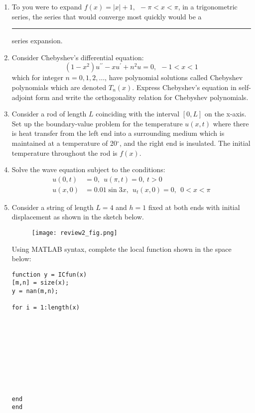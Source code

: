 \begin{fullwidth}
\begin{enumerate}
\vspace{1.0cm}

\item To you were to expand $f(x)=\left|x\right|+1, \ \ -\pi < x < \pi$, in a trigonometric series, the series that would converge most quickly would be a \rule{2cm}{0.15mm} series expansion.

\vspace{1.0cm}

\item Consider Chebyshev's differential equation:
\begin{equation*}
\left(1-x^2\right)u^{\prime \prime} - xu^{\prime}+n^2u=0, \ \ -1 < x < 1
\end{equation*}
which for integer $n=0,1,2,\dots$, have polynomial solutions called Chebyshev polynomials which are denoted $T_n(x)$.  Express Chebyshev's equation in self-adjoint form and write the orthogonality relation for Chebyshev polynomials.

\vspace{1.0cm}

\item Consider a rod of length $L$ coinciding with the interval $[0,L]$ on the x-axis.  Set up the boundary-value problem for the temperature $u(x,t)$ where there is heat transfer from the left end into a surrounding medium which is maintained at a temperature of 20$^{\circ}$, and the right end is insulated.  The initial temperature throughout the rod is $f(x)$. 

\vspace{1.0cm}

\item Solve the wave equation subject to the conditions:
\begin{align*}
u(0,t)&=0, \ \ u(\pi,t) = 0, \ t>0 \\
u(x,0)&=0.01 \sin{3x}, \ \ u_{t}(x,0)=0, \ \ 0<x<\pi
\end{align*}

\vspace{1.0cm}

\item Consider a string of length $L=4$ and $h=1$ fixed at both ends with initial displacement as shown in the sketch below.

\begin{figure}[h!]
\texttt{[image: review2\_fig.png]}
\end{figure}
Using MATLAB syntax, complete the local function shown in the space below:
\begin{lstlisting}[style=myMatlab, frame=none, numbers=none]
%% Local Function to implement IC
function y = ICfun(x)
[m,n] = size(x);
y = nan(m,n);

for i = 1:length(x)










end
end
\end{lstlisting}

\end{enumerate}

\end{fullwidth}
